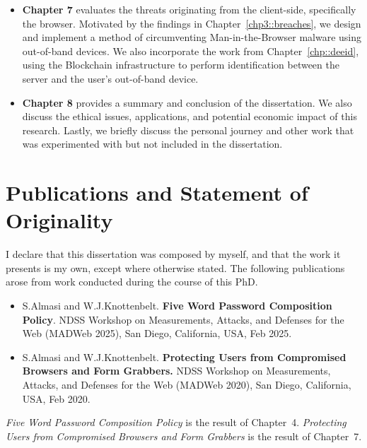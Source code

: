\begin{itemize}
\item \textbf{Chapter 7} evaluates the threats originating from the client-side, specifically the browser. Motivated by the findings in Chapter~\ref{chp3::breaches}, we design and implement a method of circumventing Man-in-the-Browser malware using out-of-band devices. We also incorporate the work from Chapter~\ref{chp::deeid}, using the Blockchain infrastructure to perform identification between the server and the user's out-of-band device.
\item \textbf{Chapter 8} provides a summary and conclusion of the dissertation. We also discuss the ethical issues, applications, and potential economic impact of this research. Lastly, we briefly discuss the personal journey and other work that was experimented with but not included in the dissertation.
\end{itemize}

\section{Publications and Statement of Originality}

I declare that this dissertation was composed by myself, and that the work it
presents is my own, except where otherwise stated. The following
publications arose from work conducted during the course of this PhD.

\begin{itemize}
    \item S.\;Almasi and W.J.\;Knottenbelt. \textbf{Five Word Password Composition Policy}. NDSS Workshop on Measurements, Attacks, and Defenses for the Web (MADWeb 2025), San Diego, California, USA, Feb 2025.
    
    \item S.\;Almasi and W.J.\;Knottenbelt. \textbf{Protecting Users from Compromised Browsers and Form Grabbers.} NDSS Workshop on Measurements, Attacks, and Defenses for the Web (MADWeb 2020), San Diego, California, USA, Feb 2020.
\end{itemize}


\textit{Five Word Password Composition Policy} is the result of Chapter~4. \textit{Protecting Users from Compromised Browsers and Form Grabbers} is the result of Chapter~7.